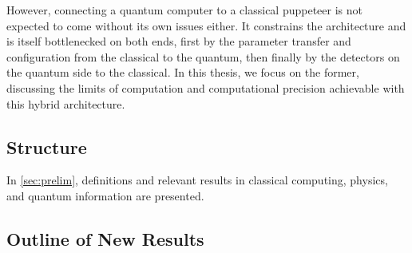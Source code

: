 However, connecting a quantum computer to a classical puppeteer is not expected
to come without its own issues either. It constrains the architecture and is
itself bottlenecked on both ends, first by the parameter transfer and
configuration from the classical to the quantum, then finally by the detectors
on the quantum side to the classical. In this thesis, we focus on the former,
discussing the limits of computation and computational precision achievable with
this hybrid architecture.

\subsection{Structure}
In \autoref{sec:prelim}, definitions and relevant results in classical
computing, physics, and quantum information are presented. 

\subsection{Outline of New Results}
